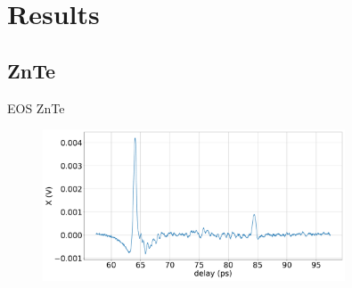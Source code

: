 \documentclass[aspectratio=1610, 9pt]{beamer}
\begin{document}
\section{Results}
\subsection{ZnTe}
\begin{frame}{EOS ZnTe}
\begin{figure}
  \includegraphics[width=0.8\textwidth]{images/2_11_30_20normalX.pdf}
\end{figure}
\end{frame}
\end{document}
